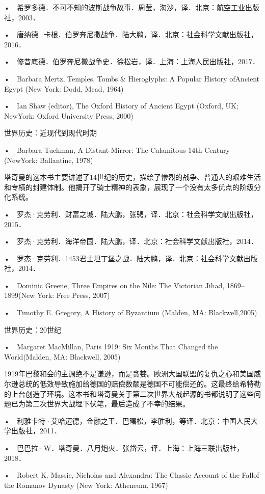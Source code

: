 •　希罗多德．不可不知的波斯战争故事．周莹，淘沙，译．北京：航空工业出版社，2003．

•　唐纳德·卡根．伯罗奔尼撒战争．陆大鹏，译．北京：社会科学文献出版社，2016．

•　修昔底德．伯罗奔尼撒战争史．徐松岩，译．上海：上海人民出版社，2017．

•　Barbara Mertz, Temples, Tombs \& Hieroglyphs: A Popular History ofAncient Egypt (New York: Dodd, Mead, 1964)

•　Ian Shaw (editor), The Oxford History of Ancient Egypt (Oxford, UK; NewYork: Oxford University Press, 2000)

世界历史：近现代到现代时期

•　Barbara Tuchman, A Distant Mirror: The Calamitous 14th Century (NewYork: Ballantine, 1978)

塔奇曼的这本书主要讲述了14世纪的历史，描绘了惨烈的战争、普通人的艰难生活和专横的封建体制。他揭开了骑士精神的表象，展现了一个没有太多优点的阶级分化系统。

•　罗杰·克劳利．财富之城．陆大鹏，张骋，译．北京：社会科学文献出版社，2015．

•　罗杰·克劳利．海洋帝国．陆大鹏，译．北京：社会科学文献出版社，2014．


•　罗杰·克劳利．1453君士坦丁堡之战．陆大鹏，译．北京：社会科学文献出版社，2014．

•　Dominic Greene, Three Empires on the Nile: The Victorian Jihad, 1869–1899(New York: Free Press, 2007)

•　Timothy E. Gregory, A History of Byzantium (Malden, MA: Blackwell,2005)


世界历史：20世纪

•　Margaret MacMillan, Paris 1919: Six Months That Changed the World(Malden, MA: Blackwell, 2005)

1919年巴黎和会的主调绝不是谦逊，而是贪婪。欧洲大国联盟的复仇之心和美国威尔逊总统的低效导致施加给德国的赔偿数额是德国不可能偿还的。这最终给希特勒的上台创造了环境。这本书和塔奇曼关于第二次世界大战起源的书都说明了这些问题已为第二次世界大战埋下伏笔，最后造成了不幸的结果。

•　利雅卡特·艾哈迈德，金融之王．巴曙松，李胜利，等译．北京：中国人民大学出版社，2011．

•　巴巴拉·W．塔奇曼．八月炮火．张岱云，译．上海：上海三联出版社，2018．

•　Robert K. Massie, Nicholas and Alexandra: The Classic Account of the Fallof the Romanov Dynasty (New York: Atheneum, 1967)



